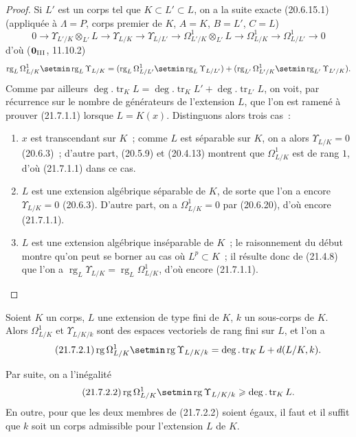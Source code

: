 \begin{proof}
Si $L'$ est un corps tel que $K\subset L'\subset L$, on a la suite exacte
(20.6.15.1) (appliquée à $\Lambda=P$, corps premier de $K$, $A=K$,
$B=L'$, $C=L$)
\[
0\to\Upsilon_{L'/K}\otimes_{L'}L\to\Upsilon_{L/K}\to\Upsilon_{L/L'}
\to\Omega^1_{L'/K}\otimes_{L'}L\to\Omega^1_{L/K}
\to\Omega^1_{L/L'}\to0
\]
d'où ($\mathbf{0}_{\rm III}$, 11.10.2)
\[
\operatorname{rg}_L\Omega^1_{L/K}\setmin\operatorname{rg}_L\Upsilon_{L/K}
=(\operatorname{rg}_L\Omega^1_{L/L'}\setmin\operatorname{rg}_L\Upsilon_{L/L'})
+(\operatorname{rg}_{L'}\Omega^1_{L'/K}\setmin\operatorname{rg}_{L'}\Upsilon_{L'/K}).
\]
Comme par ailleurs $\deg.\operatorname{tr}_K L=\deg.\operatorname{tr}_K L'
+\deg.\operatorname{tr}_{L'}L$, on voit, par récurrence sur le nombre de
générateurs de l'extension $L$, que l'on est ramené à prouver (21.7.1.1)
lorsque $L=K(x)$. Distinguons alors trois cas~:
\begin{enumerate}
  \item[\textit{a)}] $x$ est transcendant sur $K$~; comme $L$ est séparable sur
  $K$, on a alors $\Upsilon_{L/K}=0$ (20.6.3)~; d'autre part, (20.5.9) et
  (20.4.13) montrent que $\Omega^1_{L/K}$ est de rang $1$, d'où
  (21.7.1.1) dans ce cas.
  \item[\textit{b)}] $L$ est une extension algébrique séparable de $K$, de sorte
  que l'on a encore $\Upsilon_{L/K}=0$ (20.6.3). D'autre part, on a
  $\Omega^1_{L/K}=0$ par (20.6.20), d'où encore (21.7.1.1).
  \item[\textit{c)}] $L$ est une extension algébrique inséparable de $K$~; le
  raisonnement du début montre qu'on peut se borner au cas où $L^p\subset K$~;
  il résulte donc de (21.4.8) que l'on a
  $\operatorname{rg}_L\Upsilon_{L/K}=\operatorname{rg}_L\Omega^1_{L/K}$,
  d'où encore (21.7.1.1).
\end{enumerate}
\end{proof}

\begin{corollary}[21.7.2]
\label{0.21.7.2-fr}
Soient $K$ un corps, $L$ une extension de type fini de $K$, $k$ un sous-corps
de $K$. Alors $\Omega^1_{L/K}$ et $\Upsilon_{L/K/k}$ sont des espaces
vectoriels de rang fini sur $L$, et l'on a
\begin{equation}
\tag{21.7.2.1}
\label{0.21.7.2.1-fr}
\operatorname{rg}\Omega^1_{L/K}\setmin\operatorname{rg}\Upsilon_{L/K/k}
=\deg.\operatorname{tr}_K L+d(L/K,k).
\end{equation}

Par suite, on a l'inégalité
\begin{equation}
\tag{21.7.2.2}
\label{0.21.7.2.2-fr}
\operatorname{rg}\Omega^1_{L/K}\setmin\operatorname{rg}\Upsilon_{L/K/k}
\geqslant\deg.\operatorname{tr}_K L.
\end{equation}
En outre, pour que les deux membres de \textup{(21.7.2.2)} soient égaux, il faut et
il suffit que $k$ soit un corps admissible pour l'extension $L$ de $K$.
\end{corollary}


